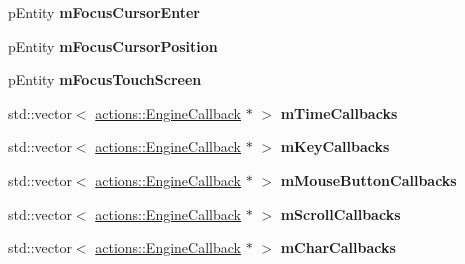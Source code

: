 \begin{DoxyCompactItemize}
\item 
\hypertarget{structfillwave_1_1Engine_1_1EngineImpl_a86861f6389206f51a3e3b34e2426b6ba}{}p\+Entity {\bfseries m\+Focus\+Cursor\+Enter}\label{structfillwave_1_1Engine_1_1EngineImpl_a86861f6389206f51a3e3b34e2426b6ba}

\item 
\hypertarget{structfillwave_1_1Engine_1_1EngineImpl_a01c78290143495069514271a1327c2ae}{}p\+Entity {\bfseries m\+Focus\+Cursor\+Position}\label{structfillwave_1_1Engine_1_1EngineImpl_a01c78290143495069514271a1327c2ae}

\item 
\hypertarget{structfillwave_1_1Engine_1_1EngineImpl_a2babbd0bb1d31375e3ce6f1b27d77a03}{}p\+Entity {\bfseries m\+Focus\+Touch\+Screen}\label{structfillwave_1_1Engine_1_1EngineImpl_a2babbd0bb1d31375e3ce6f1b27d77a03}

\item 
\hypertarget{structfillwave_1_1Engine_1_1EngineImpl_aac67334ce66fa3a337f32e94fd41c9b3}{}std\+::vector$<$ \hyperlink{classfillwave_1_1actions_1_1EngineCallback}{actions\+::\+Engine\+Callback} $\ast$ $>$ {\bfseries m\+Time\+Callbacks}\label{structfillwave_1_1Engine_1_1EngineImpl_aac67334ce66fa3a337f32e94fd41c9b3}

\item 
\hypertarget{structfillwave_1_1Engine_1_1EngineImpl_a934b84a1b0fbeb1adc144f765bb28974}{}std\+::vector$<$ \hyperlink{classfillwave_1_1actions_1_1EngineCallback}{actions\+::\+Engine\+Callback} $\ast$ $>$ {\bfseries m\+Key\+Callbacks}\label{structfillwave_1_1Engine_1_1EngineImpl_a934b84a1b0fbeb1adc144f765bb28974}

\item 
\hypertarget{structfillwave_1_1Engine_1_1EngineImpl_aaf207422cd7f2a6578afd94ba9e901d3}{}std\+::vector$<$ \hyperlink{classfillwave_1_1actions_1_1EngineCallback}{actions\+::\+Engine\+Callback} $\ast$ $>$ {\bfseries m\+Mouse\+Button\+Callbacks}\label{structfillwave_1_1Engine_1_1EngineImpl_aaf207422cd7f2a6578afd94ba9e901d3}

\item 
\hypertarget{structfillwave_1_1Engine_1_1EngineImpl_adb54fccfcc5b3c7e97e330079f261d72}{}std\+::vector$<$ \hyperlink{classfillwave_1_1actions_1_1EngineCallback}{actions\+::\+Engine\+Callback} $\ast$ $>$ {\bfseries m\+Scroll\+Callbacks}\label{structfillwave_1_1Engine_1_1EngineImpl_adb54fccfcc5b3c7e97e330079f261d72}

\item 
\hypertarget{structfillwave_1_1Engine_1_1EngineImpl_a3b977465c14e82bd5ca37659de81f831}{}std\+::vector$<$ \hyperlink{classfillwave_1_1actions_1_1EngineCallback}{actions\+::\+Engine\+Callback} $\ast$ $>$ {\bfseries m\+Char\+Callbacks}\label{structfillwave_1_1Engine_1_1EngineImpl_a3b977465c14e82bd5ca37659de81f831}


\end{DoxyCompactItemize}

